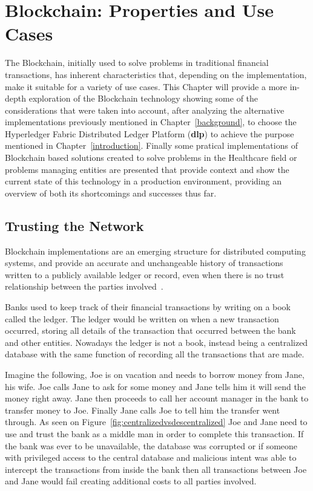 \chapter{Blockchain: Properties and Use Cases}

The Blockchain, initially used to solve problems in traditional financial
transactions, has inherent characteristics that, depending on the
implementation, make it suitable for a variety of use cases. This Chapter will
provide a more in-depth exploration of the Blockchain technology showing some
of the considerations that were taken into account, after analyzing the
alternative implementations previously mentioned in Chapter~\ref{background},
to choose the Hyperledger Fabric Distributed Ledger Platform (\textbf{dlp}) to
achieve the purpose mentioned in Chapter~\ref{introduction}. Finally some
pratical implementations of Blockchain based solutions created to solve
problems in the Healthcare field or problems managing entities are presented
that provide context and show the current state of this technology in a
production environment, providing an overview of both its shortcomings and
successes thus far.

\section{Trusting the Network}

Blockchain implementations are an emerging structure for distributed computing
systems, and provide an accurate and unchangeable history of transactions
written to a publicly available ledger or record, even when there is no trust
relationship between the parties involved~\cite{Barclay2017}.

Banks used to keep track of their financial transactions by writing on a book
called the ledger. The ledger would be written on when a new transaction
occurred, storing all details of the transaction that occurred between the bank
and other entities. Nowadays the ledger is not a book, instead being a
centralized database with the same function of recording all the transactions
that are made.

Imagine the following, Joe is on vacation and needs to borrow money from Jane,
his wife. Joe calls Jane to ask for some money and Jane tells him it will send
the money right away. Jane then proceeds to call her account manager in the
bank to transfer money to Joe. Finally Jane calls Joe to tell him the transfer
went through.  As seen on Figure~\ref{fig:centralizedvsdescentralized} Joe and
Jane need to use and trust the bank as a middle man in order to complete this
transaction. If the bank was ever to be unavailable, the database was corrupted
or if someone with  privileged access to the central database and malicious
intent was able to intercept the transactions from inside the bank then all
transactions between Joe and Jane would fail creating additional costs to all
parties involved. 


